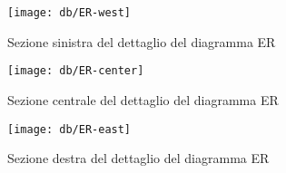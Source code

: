 \begin{figure}[b]
	\texttt{[image: db/ER-west]}
	\caption{Sezione sinistra del dettaglio del diagramma ER}
\end{figure}

\begin{figure}[b]
	\texttt{[image: db/ER-center]}
	\caption{Sezione centrale del dettaglio del diagramma ER}
\end{figure}

\begin{figure}[b]
	\texttt{[image: db/ER-east]}
	\caption{Sezione destra del dettaglio del diagramma ER}
\end{figure}

